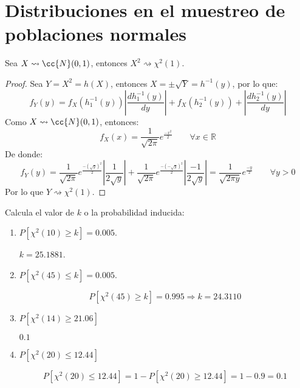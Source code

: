 \section{Distribuciones en el muestreo de poblaciones normales}
\begin{prop}
    Sea $X\rightsquigarrow\cc{N}(0,1)$, entonces $X^2\rightsquigarrow \chi^2(1)$.
    \begin{proof}
        Sea $Y = X^2 = h(X)$, entonces $X = \pm \sqrt{Y} = h^{-1}(y)$, por lo que:
        \begin{equation*}
            f_Y(y) = f_X(h_1^{-1}(y)) \left|\dfrac{dh_1^{-1}(y)}{dy}\right| + f_X(h_2^{-1}(y)) + \left|\dfrac{dh_2^{-1}(y)}{dy}\right| 
        \end{equation*}
        Como $X\rightsquigarrow \cc{N}(0,1)$, entonces:
        \begin{equation*}
            f_X(x) = \dfrac{1}{\sqrt{2\pi}} e^{\frac{-x^2}{2}} \qquad \forall x\in \mathbb{R}
        \end{equation*}
        De donde:
        \begin{equation*}
            f_Y(y) = \dfrac{1}{\sqrt{2\pi}} e^{\frac{-{(\sqrt{y})}^{2}}{2}} \left|\dfrac{1}{2\sqrt{y}}\right| + \dfrac{1}{\sqrt{2\pi}} e^{\frac{-{(-\sqrt{y})}^{2}}{2}} \left|\dfrac{-1}{2\sqrt{y}}\right|  = \dfrac{1}{\sqrt{2\pi y}} e^{\frac{-y}{2}} \qquad \forall y>0
        \end{equation*}
        Por lo que $Y\rightsquigarrow\chi^2(1)$.
    \end{proof}
\end{prop}


\begin{ejercicio}
    Calcula el valor de $k$ o la probabilidad inducida:
    \begin{enumerate}[label=\alph*)]
        \item $P[\chi^2(10)\geq k] = 0.005$.

            $k = 25.1881$.
        \item $P[\chi^2(45) \leq k] = 0.005$.

            \begin{equation*}
                P[\chi^2(45) \geq k] = 0.995 \Longrightarrow k = 24.3110
            \end{equation*}
        \item $P[\chi^2(14) \geq 21.06]$

            $0.1$
        \item $P[\chi^2(20) \leq 12.44]$

            \begin{equation*}
                P[\chi^2(20) \leq 12.44] = 1-P[\chi^2(20) \geq 12.44] = 1-0.9 = 0.1
            \end{equation*}
    \end{enumerate}
\end{ejercicio}

